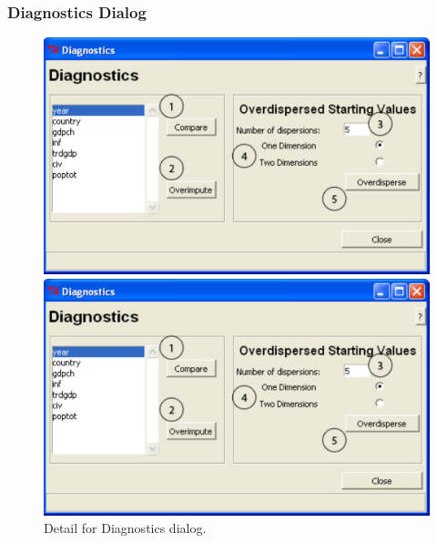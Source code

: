 \documentclass[12pt,titlepage]{article}
\begin{document}
\subsubsection{Diagnostics Dialog}
\label{sec:diagdiag}
\begin{figure}[ht]
 \begin{htmlonly} 
  \centering \includegraphics[scale=1]{diag} 
 \end{htmlonly}
 \begin{latexonly}
  \centering \includegraphics[scale=.75]{diag}
 \end{latexonly}
  \caption{Detail for Diagnostics dialog.}
\end{figure}
\end{document}
